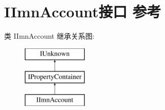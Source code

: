 \hypertarget{interface_i_imn_account}{}\section{I\+Imn\+Account接口 参考}
\label{interface_i_imn_account}
类 I\+Imn\+Account 继承关系图\+:\begin{figure}[H]
\begin{center}
\leavevmode
\includegraphics[height=3.000000cm]{interface_i_imn_account}
\end{center}
\end{figure}
